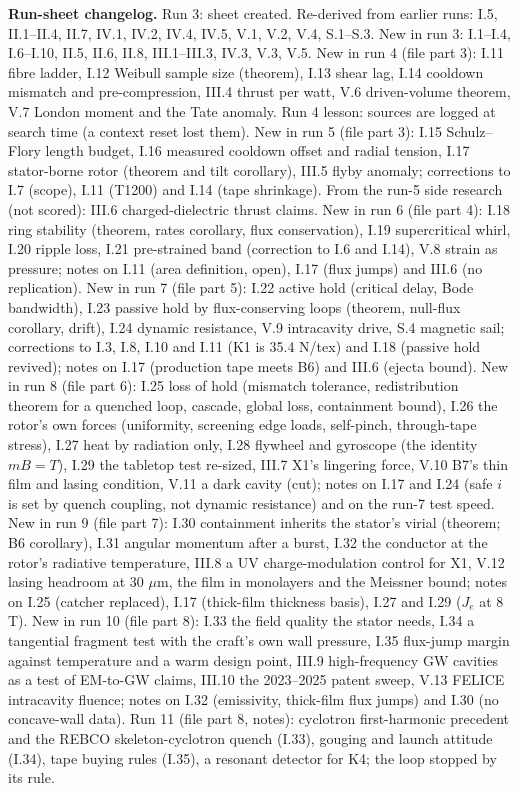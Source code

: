 \noindent\textbf{Run-sheet changelog.} Run 3: sheet created. Re-derived from earlier runs: I.5, II.1--II.4, II.7, IV.1, IV.2, IV.4, IV.5, V.1, V.2,
V.4, S.1--S.3. New in run 3: I.1--I.4, I.6--I.10, II.5, II.6, II.8, III.1--III.3, IV.3, V.3, V.5. New in run 4 (file part 3): I.11
fibre ladder, I.12 Weibull sample size (theorem), I.13 shear lag, I.14 cooldown mismatch and pre-compression, III.4 thrust per watt, V.6
driven-volume theorem, V.7 London moment and the Tate anomaly. Run 4 lesson: sources are logged at search time (a context reset lost them).
New in run 5 (file part 3): I.15 Schulz--Flory length budget, I.16 measured cooldown offset and radial tension, I.17 stator-borne rotor
(theorem and tilt corollary), III.5 flyby anomaly; corrections to I.7 (scope), I.11 (T1200) and I.14 (tape shrinkage). From the run-5 side
research (not scored): III.6 charged-dielectric thrust claims. New in run 6 (file part 4): I.18 ring stability (theorem, rates corollary,
flux conservation), I.19 supercritical whirl, I.20 ripple loss, I.21 pre-strained band (correction to I.6 and I.14), V.8 strain as pressure;
notes on I.11 (area definition, open), I.17 (flux jumps) and III.6 (no replication). New in run 7 (file part 5): I.22 active hold (critical
delay, Bode bandwidth), I.23 passive hold by flux-conserving loops (theorem, null-flux corollary, drift), I.24 dynamic resistance, V.9
intracavity drive, S.4 magnetic sail; corrections to I.3, I.8, I.10 and I.11 (K1 is 35.4 N/tex) and I.18 (passive hold revived); notes on I.17 (production tape
meets B6) and III.6 (ejecta bound). New in run 8 (file part 6): I.25 loss of hold (mismatch tolerance, redistribution theorem for a quenched loop, cascade, global loss, containment bound), I.26 the rotor's own forces (uniformity, screening edge loads, self-pinch, through-tape stress), I.27 heat by radiation only, I.28 flywheel and gyroscope (the identity $mB=T$), I.29 the tabletop test re-sized, III.7 X1's lingering force, V.10 B7's thin film and lasing condition, V.11 a dark cavity (cut); notes on I.17 and I.24 (safe $i$ is set by quench coupling, not dynamic resistance) and on the run-7 test speed. New in run 9 (file part 7): I.30 containment inherits the stator's virial (theorem; B6 corollary), I.31 angular momentum after a burst, I.32 the conductor at the rotor's radiative temperature, III.8 a UV charge-modulation control for X1, V.12 lasing headroom at 30 $\mu$m, the film in monolayers and the Meissner bound; notes on I.25 (catcher replaced), I.17 (thick-film thickness basis), I.27 and I.29 ($J_e$ at 8 T). New in run 10 (file part 8): I.33 the field quality the stator needs, I.34 a tangential fragment test with the craft's own wall pressure, I.35 flux-jump margin against temperature and a warm design point, III.9 high-frequency GW cavities as a test of EM-to-GW claims, III.10 the 2023--2025 patent sweep, V.13 FELICE intracavity fluence; notes on I.32 (emissivity, thick-film flux jumps) and I.30 (no concave-wall data). Run 11 (file part 8, notes): cyclotron first-harmonic precedent and the REBCO skeleton-cyclotron quench (I.33), gouging and launch attitude (I.34), tape buying rules (I.35), a resonant detector for K4; the loop stopped by its rule.


